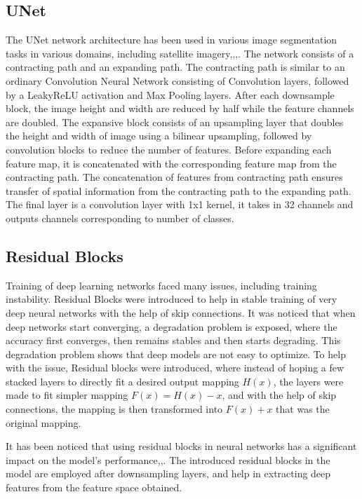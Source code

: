 \documentclass[review]{elsarticle}
\begin{document}
\subsection{UNet}
The UNet\cite{DBLP:journals/corr/RonnebergerFB15} network architecture has been used in various image segmentation tasks in various domains, including satellite imagery\cite{9760787},\cite{9426212},\cite{Chaudhary2022},\cite{Larionov2020}. The network consists of a contracting path and an expanding path. The contracting path is similar to an ordinary Convolution Neural Network consisting of Convolution layers, followed by a LeakyReLU activation and Max Pooling layers. After each downsample block, the image height and width are reduced by half while the feature channels are doubled. The expansive block consists of an upsampling layer that doubles the height and width of image using a bilinear upsampling, followed by convolution blocks to reduce the number of features. Before expanding each feature map, it is concatenated with the corresponding feature map from the contracting path. The concatenation of features from contracting path ensures transfer of spatial information from the contracting path to the expanding path. The final layer is a convolution layer with 1x1 kernel, it takes in 32 channels and outputs channels corresponding to number of classes.

\subsection{Residual Blocks}
Training of deep learning networks faced many issues, including training instability. Residual Blocks\cite{DBLP:journals/corr/HeZRS15} were introduced to help in stable training of very deep neural networks with the help of skip connections. It was noticed that when deep networks start converging, a degradation problem is exposed, where the accuracy first converges, then remains stables and then starts degrading. This degradation problem shows that deep models are not easy to optimize. To help with the issue, Residual blocks were introduced, where instead of hoping a few stacked layers to directly fit a desired output mapping \(H(x)\), the layers were made to fit simpler mapping \(F(x) = H(x)-x\), and with the help of skip connections, the mapping is then transformed into \(F(x)+x\) that was the original mapping. 

It has been noticed that using residual blocks in neural networks has a significant impact on the model's performance\cite{2019RoadTE},\cite{Wu2021HrlinknetLW},\cite{Sanya2019EXPLOITINGSC}. The introduced residual blocks in the model are employed after downsampling layers, and help in extracting deep features from the feature space obtained.
\end{document}
